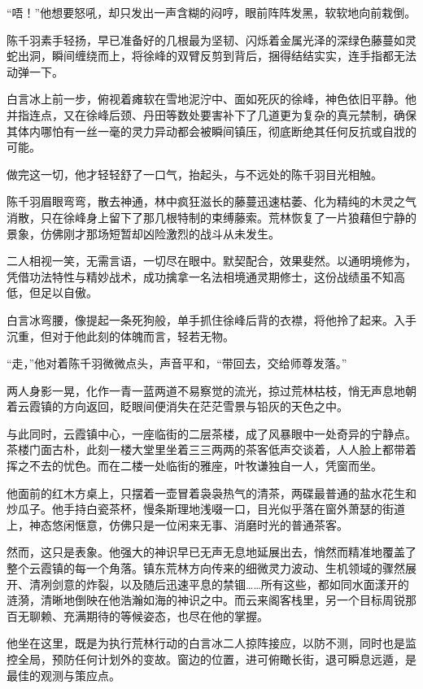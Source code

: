 “唔！”他想要怒吼，却只发出一声含糊的闷哼，眼前阵阵发黑，软软地向前栽倒。

陈千羽素手轻扬，早已准备好的几根最为坚韧、闪烁着金属光泽的深绿色藤蔓如灵蛇出洞，瞬间缠绕而上，将徐峰的双臂反剪到背后，捆得结结实实，连手指都无法动弹一下。

白言冰上前一步，俯视着瘫软在雪地泥泞中、面如死灰的徐峰，神色依旧平静。他并指连点，又在徐峰后颈、丹田等数处要害补下了几道更为复杂的真元禁制，确保其体内哪怕有一丝一毫的灵力异动都会被瞬间镇压，彻底断绝其任何反抗或自戕的可能。

做完这一切，他才轻轻舒了一口气，抬起头，与不远处的陈千羽目光相触。

陈千羽眉眼弯弯，散去神通，林中疯狂滋长的藤蔓迅速枯萎、化为精纯的木灵之气消散，只在徐峰身上留下了那几根特制的束缚藤索。荒林恢复了一片狼藉但宁静的景象，仿佛刚才那场短暂却凶险激烈的战斗从未发生。

二人相视一笑，无需言语，一切尽在眼中。默契配合，效果斐然。以通明境修为，凭借功法特性与精妙战术，成功擒拿一名法相境通灵期修士，这份战绩虽不知高低，但足以自傲。

白言冰弯腰，像提起一条死狗般，单手抓住徐峰后背的衣襟，将他拎了起来。入手沉重，但对于他此刻的体魄而言，轻若无物。

“走，”他对着陈千羽微微点头，声音平和，“带回去，交给师尊发落。”

两人身影一晃，化作一青一蓝两道不易察觉的流光，掠过荒林枯枝，悄无声息地朝着云霞镇的方向返回，眨眼间便消失在茫茫雪景与铅灰的天色之中。

\vspace{2em}

与此同时，云霞镇中心，一座临街的二层茶楼，成了风暴眼中一处奇异的宁静点。茶楼门面古朴，此刻一楼大堂里坐着三三两两的茶客低声交谈着，人人脸上都带着挥之不去的忧色。而在二楼一处临街的雅座，叶牧谦独自一人，凭窗而坐。

他面前的红木方桌上，只摆着一壶冒着袅袅热气的清茶，两碟最普通的盐水花生和炒瓜子。他手持白瓷茶杯，慢条斯理地浅啜一口，目光似乎落在窗外萧瑟的街道上，神态悠闲惬意，仿佛只是一位闲来无事、消磨时光的普通茶客。

然而，这只是表象。他强大的神识早已无声无息地延展出去，悄然而精准地覆盖了整个云霞镇的每一个角落。镇东荒林方向传来的细微灵力波动、生机领域的骤然展开、清冽剑意的炸裂，以及随后迅速平息的禁锢……所有这些，都如同水面漾开的涟漪，清晰地倒映在他浩瀚如海的神识之中。而云来阁客栈里，另一个目标周锐那百无聊赖、充满期待的等候姿态，也尽在他的掌握。

他坐在这里，既是为执行荒林行动的白言冰二人掠阵接应，以防不测，同时也是监控全局，预防任何计划外的变故。窗边的位置，进可俯瞰长街，退可瞬息远遁，是最佳的观测与策应点。

